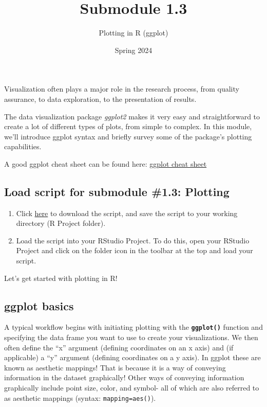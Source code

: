 \documentclass[
]{article}
\title{Submodule 1.3}
\author{Plotting in R (ggplot)}
\date{Spring 2024}
\begin{document}
\maketitle

Visualization often plays a major role in the research process, from
quality assurance, to data exploration, to the presentation of results.

The data visualization package \emph{ggplot2} makes it very easy and
straightforward to create a lot of different types of plots, from simple
to complex. In this module, we'll introduce ggplot syntax and briefly
survey some of the package's plotting capabilities.

A good ggplot cheat sheet can be found here:
\href{https://raw.githubusercontent.com/rstudio/cheatsheets/main/data-visualization.pdf}{ggplot
cheat sheet}

\hypertarget{load-script-for-submodule-1.3-plotting}{%
\subsection{Load script for submodule \#1.3:
Plotting}\label{load-script-for-submodule-1.3-plotting}}

\begin{enumerate}
\def\labelenumi{\arabic{enumi}.}
\item
  Click \href{module1_3.R}{here} to download the script, and save the
  script to your working directory (R Project folder).
\item
  Load the script into your RStudio Project. To do this, open your
  RStudio Project and click on the folder icon in the toolbar at the top
  and load your script.
\end{enumerate}

Let's get started with plotting in R!

\hypertarget{ggplot-basics}{%
\subsection{ggplot basics}\label{ggplot-basics}}

A typical workflow begins with initiating plotting with the
\textbf{\texttt{ggplot()}} function and specifying the data frame you
want to use to create your visualizations. We then often define the
``x'' argument (defining coordinates on an x axis) and (if applicable) a
``y'' argument (defining coordinates on a y axis). In ggplot these are
known as aesthetic mappings! That is because it is a way of conveying
information in the dataset graphically! Other ways of conveying
information graphically include point size, color, and symbol- all of
which are also referred to as aesthetic mappings (syntax:
\texttt{mapping=aes()}).
\end{document}
